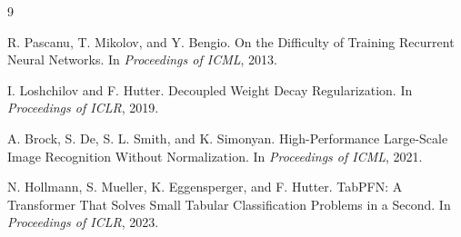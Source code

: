 \documentclass[11pt]{article}
\newcommand{\1}{\mathbf{1}}
\begin{document}
\begin{thebibliography}{9}

R. Pascanu, T. Mikolov, and Y. Bengio.
\newblock On the Difficulty of Training Recurrent Neural Networks.
\newblock In \emph{Proceedings of ICML}, 2013.

I. Loshchilov and F. Hutter.
\newblock Decoupled Weight Decay Regularization.
\newblock In \emph{Proceedings of ICLR}, 2019.

A. Brock, S. De, S. L. Smith, and K. Simonyan.
\newblock High-Performance Large-Scale Image Recognition Without Normalization.
\newblock In \emph{Proceedings of ICML}, 2021.

N. Hollmann, S. Mueller, K. Eggensperger, and F. Hutter.
\newblock TabPFN: A Transformer That Solves Small Tabular Classification Problems in a Second.
\newblock In \emph{Proceedings of ICLR}, 2023.

\end{thebibliography}
\end{document}
